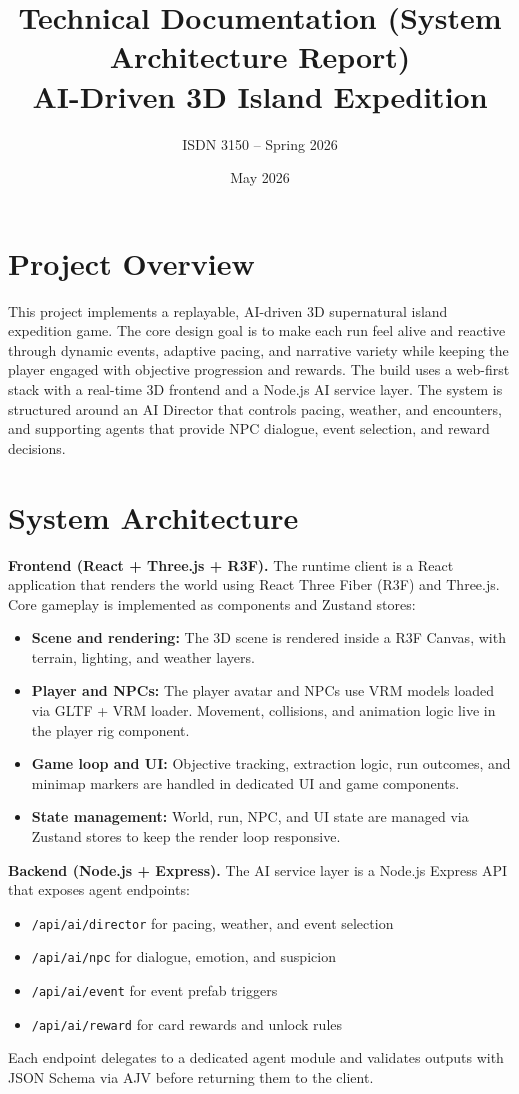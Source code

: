 \documentclass[12pt]{article}
\title{Technical Documentation (System Architecture Report)\\AI-Driven 3D Island Expedition}
\author{ISDN 3150 -- Spring 2026}
\date{May 2026}
\begin{document}
\maketitle

\section*{Project Overview}
This project implements a replayable, AI-driven 3D supernatural island expedition game. The core design goal is to make each run feel alive and reactive through dynamic events, adaptive pacing, and narrative variety while keeping the player engaged with objective progression and rewards. The build uses a web-first stack with a real-time 3D frontend and a Node.js AI service layer. The system is structured around an AI Director that controls pacing, weather, and encounters, and supporting agents that provide NPC dialogue, event selection, and reward decisions.

\section*{System Architecture}
\textbf{Frontend (React + Three.js + R3F).}
The runtime client is a React application that renders the world using React Three Fiber (R3F) and Three.js. Core gameplay is implemented as components and Zustand stores:
\begin{itemize}[leftmargin=1.1em]
  \item \textbf{Scene and rendering:} The 3D scene is rendered inside a R3F Canvas, with terrain, lighting, and weather layers.
  \item \textbf{Player and NPCs:} The player avatar and NPCs use VRM models loaded via GLTF + VRM loader. Movement, collisions, and animation logic live in the player rig component.
  \item \textbf{Game loop and UI:} Objective tracking, extraction logic, run outcomes, and minimap markers are handled in dedicated UI and game components.
  \item \textbf{State management:} World, run, NPC, and UI state are managed via Zustand stores to keep the render loop responsive.
\end{itemize}

\textbf{Backend (Node.js + Express).}
The AI service layer is a Node.js Express API that exposes agent endpoints:
\begin{itemize}[leftmargin=1.1em]
  \item \texttt{/api/ai/director} for pacing, weather, and event selection
  \item \texttt{/api/ai/npc} for dialogue, emotion, and suspicion
  \item \texttt{/api/ai/event} for event prefab triggers
  \item \texttt{/api/ai/reward} for card rewards and unlock rules
\end{itemize}
Each endpoint delegates to a dedicated agent module and validates outputs with JSON Schema via AJV before returning them to the client.
\end{document}
